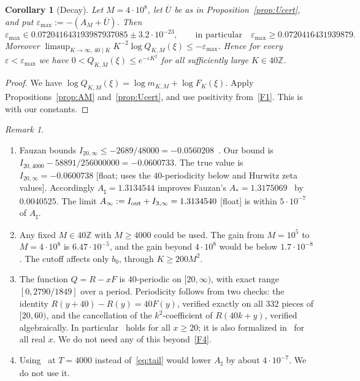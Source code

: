 \documentclass[11pt]{article}
\newtheorem{corollary}{Corollary}
\theoremstyle{remark}
\newtheorem{remark}{Remark}
\newcommand{\Z}{\mathbb{Z}}
\newcommand{\Ubar}{\overline{U}}
\newcommand{\epsmax}{\varepsilon_{\max}}
\begin{document}
\begin{corollary}[Decay]\label{cor:decay}
Let $M=4\cdot10^8$, let $\Ubar$ be as in Proposition~\ref{prop:Ucert}, and put $\epsmax:=-(A_M+\Ubar)$. Then
\[
\epsmax\in0.072041643193987937085\pm3.2\cdot10^{-23},\qquad\text{in particular}\quad\epsmax\ge0.0720416431939879 .
\]
Moreover $\limsup_{K\to\infty,\,40\mid K}K^{-2}\log Q_{K,M}(\xi)\le-\epsmax$. Hence for every $\varepsilon<\epsmax$ we have $0<Q_{K,M}(\xi)\le e^{-\varepsilon K^2}$ for all sufficiently large $K\in40\Z$.
\end{corollary}

\begin{proof}
We have $\log Q_{K,M}(\xi)=\log m_{K,M}+\log F_K(\xi)$. Apply Propositions~\ref{prop:AM} and~\ref{prop:Ucert}, and use positivity from~\ref{F1}. This is~\cite[(7.1)]{F} with our constants.
\end{proof}

\begin{remark}\label{rem:Acompare}
\begin{enumerate}[label=(\roman*)]
\item Fauzan bounds $I_{20,\infty}\le-2689/48000=-0.0560208$~\cite[(5.16)]{F}. Our bound is $I_{20,4000}-58891/256000000=-0.0600733$. The true value is $I_{20,\infty}=-0.0600738$ [float; uses the $40$-periodicity below and Hurwitz zeta values]. Accordingly $A_\sharp=1.3134544$ improves Fauzan's $A_*=1.3175069$~\cite[(5.19)]{F} by $0.0040525$. The limit $A_\infty:=I_{\rm out}+I_{3,\infty}=1.3134540$ [float] is within $5\cdot10^{-7}$ of $A_\sharp$.
\item Any fixed $M\in40\Z$ with $M\ge4000$ could be used. The gain from $M=10^5$ to $M=4\cdot10^8$ is $6.47\cdot10^{-5}$, and the gain beyond $4\cdot10^8$ would be below $1.7\cdot10^{-8}$. The cutoff affects only $b_0$, through $K\ge200M^2$.
\item The function $Q=R-xF$ is $40$-periodic on $[20,\infty)$, with exact range $[0,2790/1849]$ over a period. Periodicity follows from two checks: the identity $R(y+40)-R(y)=40F(y)$, verified exactly on all $332$ pieces of $[20,60)$, and the cancellation of the $k^2$-coefficient of $R(40k+y)$, verified algebraically. In particular~\cite[(5.14)]{F} holds for all $x\ge20$; it is also formalized in~\cite{DR} for all real $x$. We do not need any of this beyond~\ref{F4}.
\item Using~\cite[(5.15)]{F} at $T=4000$ instead of~\eqref{eq:tail} would lower $A_\sharp$ by about $4\cdot10^{-7}$. We do not use it.
\end{enumerate}
\end{remark}
\end{document}
